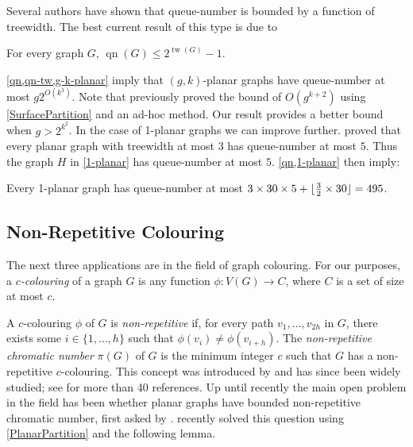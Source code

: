 \documentclass{patmorin}
\DeclareMathOperator{\tw}{tw}
\DeclareMathOperator{\qn}{qn}
\DeclarePairedDelimiter{\floor}{\lfloor}{\rfloor}
\renewcommand{\le}{\leqslant}
\renewcommand{\geq}{\geqslant}
\begin{document}
Several authors have shown that queue-number is bounded by a function of treewidth. The best current result of this type is due to \cite{wiechert:on}

\begin{thm}\label{qn-tw}
    For every graph $G$, $\qn(G)\le 2^{\tw(G)}-1$.
\end{thm}

\cref{qn,qn-tw,g-k-planar} imply that $(g,k)$-planar graphs have queue-number at most $g 2^{O(k^3)}$. 
Note that \citet{dujmovic.joret.ea:planar} previously proved the bound of 
$O(g^{k+2})$ using \cref{SurfacePartition} and an ad-hoc method. Our result provides a better bound when $g>2^{k^2}$. 
%
%
In the case of 1-planar graphs we can improve further. \citet{ABGKP18} proved that every planar graph with treewidth at most $3$ has queue-number at most $5$. Thus the graph $H$ in \cref{1-planar} has queue-number at most $5$. \cref{qn,1-planar} then imply:

\begin{prop}
Every 1-planar graph has queue-number at most $3 \times 30 \times 5 + \floor{\tfrac{3}{2} \times 30} = 495$. \end{prop}


\subsection{Non-Repetitive Colouring}

The next three applications are in the field of graph colouring. For our purposes, a \emph{$c$-colouring} of a graph $G$ is any function $\phi\colon V(G)\to C$, where $C$ is a set of size at most $c$.

A $c$-colouring $\phi$ of $G$ is \emph{non-repetitive} if, for every path $v_1,\ldots,v_{2h}$ in $G$, there exists some $i\in\{1,\ldots,h\}$ such that $\phi(v_i)\neq\phi(v_{i+h})$.  The \emph{non-repetitive chromatic number} $\pi(G)$ of $G$ is the minimum integer $c$ such that $G$ has a non-repetitive $c$-colouring. This concept was introduced by \citet{AGHR-RSA02} and has since been widely studied; see \citep{dujmovic.esperet.ea:planar} for more than 40 references. Up until recently the main open problem in the field has been whether planar graphs have bounded non-repetitive chromatic number, first asked by \citet{AGHR-RSA02}. \citet{dujmovic.esperet.ea:planar} recently solved this question using \cref{PlanarPartition} and the following lemma.
\end{document}
